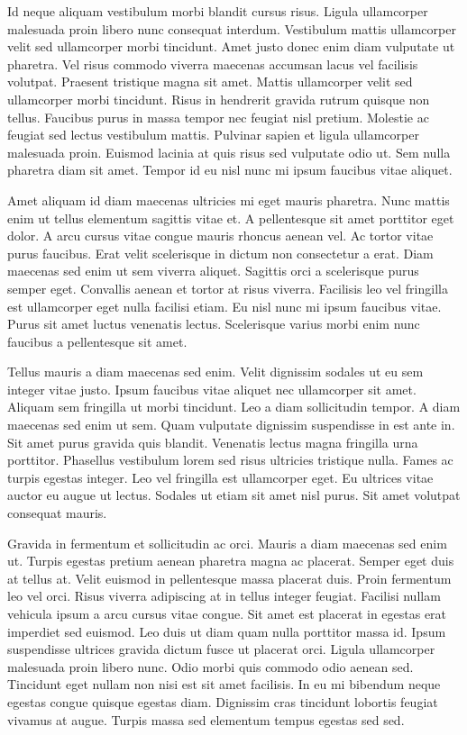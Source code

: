 \documentclass[11pt,a4paper]{article}
\begin{document}
Id neque aliquam vestibulum morbi blandit cursus risus. Ligula ullamcorper malesuada proin libero nunc consequat interdum. Vestibulum mattis ullamcorper velit sed ullamcorper morbi tincidunt. Amet justo donec enim diam vulputate ut pharetra. Vel risus commodo viverra maecenas accumsan lacus vel facilisis volutpat. Praesent tristique magna sit amet. Mattis ullamcorper velit sed ullamcorper morbi tincidunt. Risus in hendrerit gravida rutrum quisque non tellus. Faucibus purus in massa tempor nec feugiat nisl pretium. Molestie ac feugiat sed lectus vestibulum mattis. Pulvinar sapien et ligula ullamcorper malesuada proin. Euismod lacinia at quis risus sed vulputate odio ut. Sem nulla pharetra diam sit amet. Tempor id eu nisl nunc mi ipsum faucibus vitae aliquet.

Amet aliquam id diam maecenas ultricies mi eget mauris pharetra. Nunc mattis enim ut tellus elementum sagittis vitae et. A pellentesque sit amet porttitor eget dolor. A arcu cursus vitae congue mauris rhoncus aenean vel. Ac tortor vitae purus faucibus. Erat velit scelerisque in dictum non consectetur a erat. Diam maecenas sed enim ut sem viverra aliquet. Sagittis orci a scelerisque purus semper eget. Convallis aenean et tortor at risus viverra. Facilisis leo vel fringilla est ullamcorper eget nulla facilisi etiam. Eu nisl nunc mi ipsum faucibus vitae. Purus sit amet luctus venenatis lectus. Scelerisque varius morbi enim nunc faucibus a pellentesque sit amet.

Tellus mauris a diam maecenas sed enim. Velit dignissim sodales ut eu sem integer vitae justo. Ipsum faucibus vitae aliquet nec ullamcorper sit amet. Aliquam sem fringilla ut morbi tincidunt. Leo a diam sollicitudin tempor. A diam maecenas sed enim ut sem. Quam vulputate dignissim suspendisse in est ante in. Sit amet purus gravida quis blandit. Venenatis lectus magna fringilla urna porttitor. Phasellus vestibulum lorem sed risus ultricies tristique nulla. Fames ac turpis egestas integer. Leo vel fringilla est ullamcorper eget. Eu ultrices vitae auctor eu augue ut lectus. Sodales ut etiam sit amet nisl purus. Sit amet volutpat consequat mauris.

Gravida in fermentum et sollicitudin ac orci. Mauris a diam maecenas sed enim ut. Turpis egestas pretium aenean pharetra magna ac placerat. Semper eget duis at tellus at. Velit euismod in pellentesque massa placerat duis. Proin fermentum leo vel orci. Risus viverra adipiscing at in tellus integer feugiat. Facilisi nullam vehicula ipsum a arcu cursus vitae congue. Sit amet est placerat in egestas erat imperdiet sed euismod. Leo duis ut diam quam nulla porttitor massa id. Ipsum suspendisse ultrices gravida dictum fusce ut placerat orci. Ligula ullamcorper malesuada proin libero nunc. Odio morbi quis commodo odio aenean sed. Tincidunt eget nullam non nisi est sit amet facilisis. In eu mi bibendum neque egestas congue quisque egestas diam. Dignissim cras tincidunt lobortis feugiat vivamus at augue. Turpis massa sed elementum tempus egestas sed sed.
\end{document}
